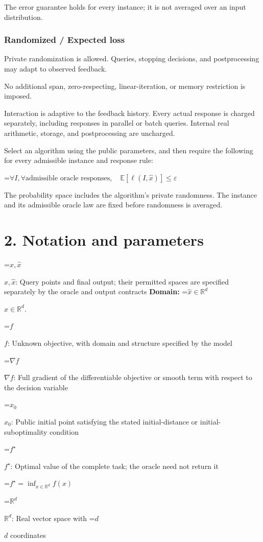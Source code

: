 \documentclass[10pt,a4paper]{article}
\newcommand{\AtlasMath}[1]{\par\begingroup\centering\setbox0=\hbox{$\displaystyle #1$}\ifdim\wd0>1.4\linewidth\typeout{ATLAS WIDE FORMULA: \the\wd0}\fi\ifdim\wd0>\linewidth\resizebox{\linewidth}{!}{\box0}\else\box0\fi\par\endgroup}
\newcommand{\AtlasInlineMath}[1]{\begingroup\setbox0=\hbox{$#1$}\ifdim\wd0>.4\linewidth\endgroup\AtlasMath{#1}\else\endgroup$#1$\fi}
\begin{document}
The error guarantee holds for every instance; it is not averaged over an input distribution.

\subsubsection{Randomized / Expected loss}
Private randomization is allowed. Queries, stopping decisions, and postprocessing may adapt to observed feedback.

No additional span, zero-respecting, linear-iteration, or memory restriction is imposed.

Interaction is adaptive to the feedback history. Every actual response is charged separately, including responses in parallel or batch queries. Internal real arithmetic, storage, and postprocessing are uncharged.

Select an algorithm using the public parameters, and then require the following for every admissible instance and response rule:


\AtlasMath{\forall I,\forall\text{admissible oracle responses},\quad\mathbb{E}[\ell(I,\widehat{x})]\le\varepsilon}


The probability space includes the algorithm's private randomness. The instance and its admissible oracle law are fixed before randomness is averaged.

\section{2. Notation and parameters}
\AtlasInlineMath{x,\widehat{x}}: Query points and final output; their permitted spaces are specified separately by the oracle and output contracts \textbf{Domain:} \AtlasInlineMath{\widehat{x}\in \mathbb{R}^d}.

\AtlasInlineMath{f}: Unknown objective, with domain and structure specified by the model

\AtlasInlineMath{\nabla f}: Full gradient of the differentiable objective or smooth term with respect to the decision variable

\AtlasInlineMath{x_0}: Public initial point satisfying the stated initial-distance or initial-suboptimality condition

\AtlasInlineMath{f^\star}: Optimal value of the complete task; the oracle need not return it


\AtlasMath{f^\star=\inf_{x\in \mathbb{R}^d}f(x)}


\AtlasInlineMath{\mathbb{R}^d}: Real vector space with \AtlasInlineMath{d} coordinates
\end{document}

